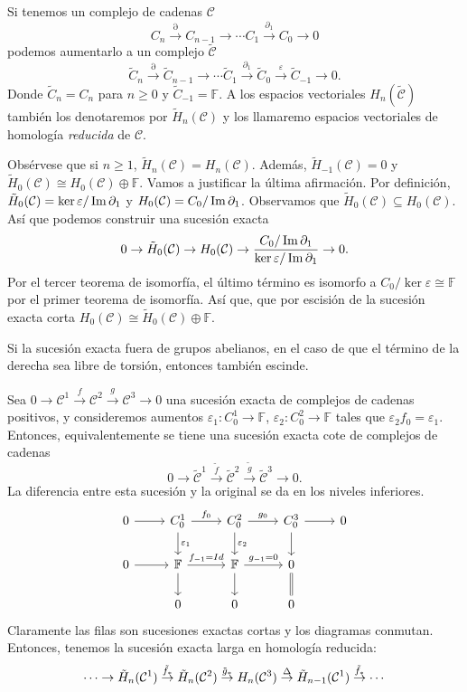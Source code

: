 \documentclass[HS.tex]{subfiles}
\begin{document}
Si tenemos un complejo de cadenas $\mathcal{C}$
\[
C_n\overset{\partial}{\to} C_{n-1}\to\cdots C_1\overset{\partial_1}{\to} C_0\to 0
\]
podemos aumentarlo a un complejo $\tilde{\mathcal{C}}$
\[
\tilde{C}_n\overset{\partial}{\to} \tilde{C}_{n-1}\to\cdots \tilde{C}_1\overset{\partial_1}{\to} \tilde{C}_0\overset{\varepsilon}{\to}\tilde{C}_{-1}\to 0.
\]
Donde $\tilde{C}_n=C_n$ para $n\geq 0$ y $\tilde{C}_{-1}=\mathbb{F}$. A los espacios vectoriales $H_n(\tilde{\mathcal{C}})$ también los denotaremos por $\tilde{H}_n( \mathcal{C})$ y los llamaremo espacios vectoriales de homología \emph{reducida} de $\mathcal{C}$. 

Obsérvese que si $n\geq 1$, $\tilde{H}_n( \mathcal{C})=H_n( \mathcal{C})$. Además, $\tilde{H}_{-1}(\mathcal{C})=0$ y $\tilde{H}_0(\mathcal{C})\cong H_0(\mathcal{C})\oplus\mathbb{F}$. Vamos a justificar la última afirmación. Por definición, $\tilde{H}_0(\mathcal{C})=\ker{\varepsilon}/\operatorname{Im}{\partial_1}$ y $H_0(\mathcal{C})=C_0/\operatorname{Im}{\partial_1}$. Observamos que $\tilde{H}_0(\mathcal{C})\subseteq H_0(\mathcal{C})$. Así que podemos construir una sucesión exacta
\[
0\to \tilde{H}_0(\mathcal{C})\to H_0(\mathcal{C})\to \frac{C_0/\operatorname{Im}{\partial_1}}{\ker{\varepsilon}/\operatorname{Im}{\partial_1}}\to 0.
\]
Por el tercer teorema de isomorfía, el último término es isomorfo a $C_0/\ker{\varepsilon}\cong \mathbb{F}$ por el primer teorema de isomorfía. Así que, que por escisión de la sucesión exacta corta $H_0(\mathcal{C})\cong \tilde{H}_0(\mathcal{C})\oplus\mathbb{F}$.

\begin{nota}
Si la sucesión exacta fuera de grupos abelianos, en el caso de que el término de la derecha sea libre de torsión, entonces también escinde.
\end{nota}

Sea $0\to\mathcal{C}^1\overset{f}{\to}\mathcal{C}^2\overset{g}{\to}\mathcal{C}^3\to 0$ una sucesión exacta de complejos de cadenas positivos, y consideremos aumentos $\varepsilon_1:C_0^1\to\mathbb{F}$, $\varepsilon_2:C_0^2\to\mathbb{F}$ tales que $\varepsilon_2f_0=\varepsilon_1$. Entonces, equivalentemente se tiene una sucesión exacta cote de complejos de cadenas
\[
0\to\tilde{\mathcal{C}}^1\overset{\tilde{f}}{\to}\tilde{\mathcal{C}}^2\overset{\tilde{g}}{\to}\tilde{\mathcal{C}}^3\to 0.
\]
La diferencia entre esta sucesión y la original se da en los niveles inferiores.
\[
\begin{tikzcd}
0\arrow[r] & C_0^1\arrow[r,"f_0"]\arrow[d, "\varepsilon_1"] & C_0^2\arrow[r,"g_0"]\arrow[d, "\varepsilon_2"]& C_0^3\arrow[r]\arrow[d] & 0\\
0\arrow[r] & \F\arrow[r,"f_{-1}=Id"]\arrow[d] & \F\arrow[r, "g_{-1}=0"]\arrow[d] & 0\arrow[d,equal] &\\
& 0 & 0 & 0 &
\end{tikzcd}
\]
Claramente las filas son sucesiones exactas cortas y los diagramas conmutan. Entonces, tenemos la sucesión exacta larga en homología reducida:
\[
\cdots \to\tilde{H}_n(\mathcal{C}^1)\overset{\tilde{f}_*}{\to} \tilde{H}_n(\mathcal{C}^2)\overset{\tilde{g}_*}{\to}H_n(\mathcal{C}^3)\overset{\Delta}{\to}\tilde{H}_{n-1}(\mathcal{C}^1)\overset{\tilde{f}_*}{\to}\cdots
\]
\end{document}
